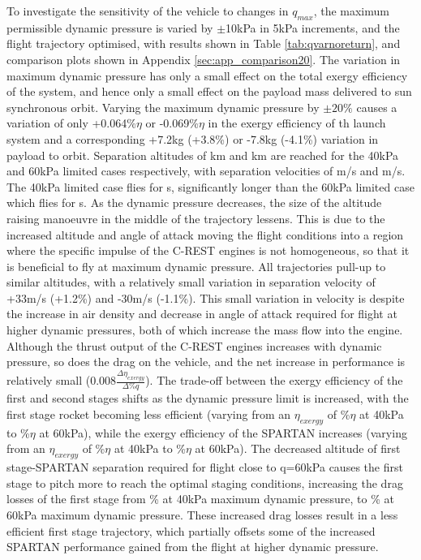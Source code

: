 To investigate the sensitivity of the vehicle to changes in $q_{max}$, the maximum permissible dynamic pressure is varied by $\pm$10kPa in 5kPa increments, and the flight trajectory optimised, with results shown in Table \ref{tab:qvarnoreturn}, and comparison plots shown in Appendix \ref{sec:app_comparison20}.
The variation in maximum dynamic pressure has only a small effect on the total exergy efficiency of the system, and hence only a small effect on the payload mass delivered to sun synchronous orbit.  Varying the maximum dynamic pressure by $\pm20\%$ causes a variation of only +0.064\%$\eta$ or -0.069\%$\eta$ in the exergy efficiency of th launch system and a corresponding +7.2kg (+3.8\%) or -7.8kg (-4.1\%) variation in payload to orbit.  
Separation altitudes of \secondthirdSeparationAltqFortyNoReturn km and \secondthirdSeparationAltqSixtyNoReturn km are reached for the 40kPa and 60kPa limited cases respectively, with separation velocities of \secondthirdSeparationvqFortyNoReturn m/s and \secondthirdSeparationvqSixtyNoReturn m/s. The 40kPa limited case flies for \secondFlightTimeqFortyNoReturn s, significantly longer than the 60kPa limited case which flies for \secondFlightTimeqSixtyNoReturn s.
As the dynamic pressure decreases, the size of the altitude raising manoeuvre in the middle of the trajectory lessens. This is due to the increased altitude and angle of attack moving the flight conditions into a region where the specific impulse of the C-REST engines is not homogeneous, so that it is beneficial to fly at maximum dynamic pressure.  
All trajectories pull-up to similar altitudes, with a relatively small variation in separation velocity of +33m/s (+1.2\%) and -30m/s (-1.1\%).
This small variation in velocity is despite the increase in air density and decrease in angle of attack required for flight at higher dynamic pressures, both of which increase the mass flow into the engine. Although the thrust output of the C-REST engines increases with dynamic pressure, so does the drag on the vehicle, and the net increase in performance is relatively small (0.008$ \frac{\Delta\eta_{exergy}}{\Delta\%q}$). 
The trade-off between the exergy efficiency of the first and second stages shifts as the dynamic pressure limit is increased, with the first stage rocket becoming less efficient (varying from an $\eta_{exergy}$ of \firstExergyEffqFortyNoReturn\%$\eta$ at 40kPa to \firstExergyEffqSixtyNoReturn\%$\eta$ at 60kPa), while the exergy efficiency of the SPARTAN increases (varying from an $\eta_{exergy}$ of \secondExergyEffqFortyNoReturn\%$\eta$ at 40kPa to \secondExergyEffqSixtyNoReturn\%$\eta$ at 60kPa). The decreased altitude of first stage-SPARTAN separation required for flight close to q=60kPa causes the first stage to pitch more to reach the optimal staging conditions, increasing the drag losses of the first stage from  \WDoneqFortyNoReturn\% at 40kPa maximum dynamic pressure, to \WDoneqSixtyNoReturn\% at 60kPa maximum dynamic pressure. 
These increased drag losses result in a less efficient first stage trajectory, which partially offsets some of the increased SPARTAN performance gained from the flight at higher dynamic pressure. 

